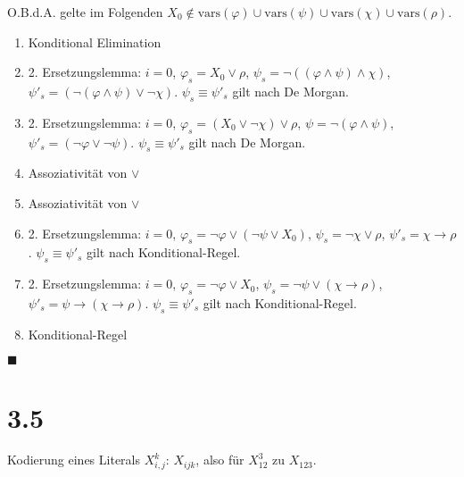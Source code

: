 \documentclass[12pt,a4paper]{scrartcl}
\begin{document}
O.B.d.A. gelte im Folgenden $X_0 \not\in \textrm{vars}(\varphi) \cup \textrm{vars}(\psi) \cup \textrm{vars}(\chi) \cup \textrm{vars}(\rho)$.

\begin{enumerate} 
\item Konditional Elimination 
\item 2. Ersetzungslemma:
$i = 0$, $\varphi_s = X_0 \vee \rho$, $\psi_s = \neg((\varphi \wedge \psi) \wedge \chi)$, $\psi'_s = (\neg(\varphi \wedge \psi) \vee \neg\chi)$.
$\psi_s \equiv \psi'_s$ gilt nach De Morgan.
\item 2. Ersetzungslemma:
$i = 0$, $\varphi_s = (X_0 \vee \neg\chi) \vee \rho$, $\psi = \neg(\varphi \wedge \psi)$, $\psi'_s = (\neg\varphi \vee \neg\psi)$.
$\psi_s \equiv \psi'_s$ gilt nach De Morgan.
\item Assoziativität von $\vee$
\item Assoziativität von $\vee$
\item 2. Ersetzungslemma:
$i = 0$, $\varphi_s = \neg\varphi \vee (\neg\psi \vee X_0)$, $\psi_s = \neg\chi \vee \rho$, $\psi'_s = \chi \rightarrow \rho$.
$\psi_s \equiv \psi'_s$ gilt nach Konditional-Regel.
\item 2. Ersetzungslemma:
$i = 0$, $\varphi_s = \neg\varphi \vee X_0$, $\psi_s = \neg\psi \vee (\chi \rightarrow \rho)$, $\psi'_s = \psi \rightarrow (\chi \rightarrow \rho)$.
$\psi_s \equiv \psi'_s$ gilt nach Konditional-Regel.
\item Konditional-Regel
\end{enumerate}

$\blacksquare$

\section*{3.5}

Kodierung eines Literals $X_{i,j}^k$: $X_{ijk}$, also für $X_{12}^3$ zu $X_{123}$.
\end{document}

